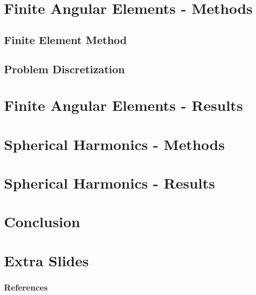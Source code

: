 \documentclass[9pt]{beamer}
\begin{document}
\section{Finite Angular Elements - Methods}

\subsection{Finite Element Method}



\subsection{Problem Discretization}


\section{Finite Angular Elements - Results}


\section{Spherical Harmonics - Methods}


\section{Spherical Harmonics - Results}


\section{Conclusion}



\section{Extra Slides}


% 
\begin{frame}[allowframebreaks]
  \frametitle{References}
  
  {\footnotesize  }

\end{frame}

\end{document}
